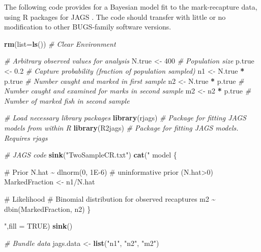 \documentclass[
]{krantz}
\makeatletter
\newenvironment{Shaded}{\begin{snugshade}}{\end{snugshade}}
\newcommand{\AttributeTok}[1]{\textcolor[rgb]{0.27,0.27,0.27}{#1}}
\newcommand{\CommentTok}[1]{\textcolor[rgb]{0.37,0.37,0.37}{\textit{#1}}}
\newcommand{\ConstantTok}[1]{\textcolor[rgb]{0.37,0.37,0.37}{#1}}
\newcommand{\DecValTok}[1]{\textcolor[rgb]{0.06,0.06,0.06}{#1}}
\newcommand{\FloatTok}[1]{\textcolor[rgb]{0.06,0.06,0.06}{#1}}
\newcommand{\FunctionTok}[1]{\textcolor[rgb]{0.27,0.27,0.27}{\textbf{#1}}}
\newcommand{\NormalTok}[1]{#1}
\newcommand{\OtherTok}[1]{\textcolor[rgb]{0.37,0.37,0.37}{#1}}
\newcommand{\SpecialCharTok}[1]{\textcolor[rgb]{0.43,0.43,0.43}{\textbf{#1}}}
\newcommand{\StringTok}[1]{\textcolor[rgb]{0.5,0.5,0.5}{#1}}
\newenvironment{kframe}{%
\medskip{}
\setlength{\fboxsep}{.8em}
 \def\at@end@of@kframe{}%
 \ifinner\ifhmode%
  \def\at@end@of@kframe{\end{minipage}}%
  \begin{minipage}{\columnwidth}%
 \fi\fi%
 \def\FrameCommand##1{\hskip\@totalleftmargin \hskip-\fboxsep
 \colorbox{shadecolor}{##1}\hskip-\fboxsep
     \hskip-\linewidth \hskip-\@totalleftmargin \hskip\columnwidth}%
 \MakeFramed {\advance\hsize-\width
   \@totalleftmargin\z@ \linewidth\hsize
   \@setminipage}}%
 {\par\unskip\endMakeFramed%
 \at@end@of@kframe}
\renewenvironment{Shaded}{\begin{kframe}}{\end{kframe}}
\makeatother
\begin{document}
The following code provides for a Bayesian model fit to the mark-recapture data, using R packages for JAGS \citep{plummer2003}. The code should transfer with little or no modification to other BUGS-family software versions.

\begin{Shaded}
\begin{Highlighting}[]
\FunctionTok{rm}\NormalTok{(}\AttributeTok{list=}\FunctionTok{ls}\NormalTok{()) }\CommentTok{\# Clear Environment}

\CommentTok{\# Arbitrary \textquotesingle{}observed\textquotesingle{} values for analysis}
\NormalTok{N.true }\OtherTok{\textless{}{-}} \DecValTok{400}  \CommentTok{\# Population size}
\NormalTok{p.true }\OtherTok{\textless{}{-}} \FloatTok{0.2} \CommentTok{\# Capture probability (fraction of population sampled)}
\NormalTok{n1 }\OtherTok{\textless{}{-}}\NormalTok{ N.true }\SpecialCharTok{*}\NormalTok{ p.true }\CommentTok{\# Number caught and marked in first sample}
\NormalTok{n2 }\OtherTok{\textless{}{-}}\NormalTok{ N.true }\SpecialCharTok{*}\NormalTok{ p.true }\CommentTok{\# Number caught and examined for marks in second sample}
\NormalTok{m2 }\OtherTok{\textless{}{-}}\NormalTok{ n2 }\SpecialCharTok{*}\NormalTok{ p.true }\CommentTok{\# Number of marked fish in second sample}

\CommentTok{\# Load necessary library packages}
\FunctionTok{library}\NormalTok{(rjags)   }\CommentTok{\# Package for fitting JAGS models from within R}
\FunctionTok{library}\NormalTok{(R2jags)  }\CommentTok{\# Package for fitting JAGS models. Requires rjags}

\CommentTok{\# JAGS code}
\FunctionTok{sink}\NormalTok{(}\StringTok{"TwoSampleCR.txt"}\NormalTok{)}
\FunctionTok{cat}\NormalTok{(}\StringTok{"}
\StringTok{    model \{}

\StringTok{  \# Prior}
\StringTok{    N.hat \textasciitilde{} dlnorm(0, 1E{-}6) \# uninformative prior (N.hat\textgreater{}0)}
\StringTok{    MarkedFraction \textless{}{-} n1/N.hat}

\StringTok{  \# Likelihood}
\StringTok{    \# Binomial distribution for observed recaptures}
\StringTok{    m2 \textasciitilde{} dbin(MarkedFraction, n2)}
\StringTok{    \}}

\StringTok{    "}\NormalTok{,}\AttributeTok{fill =} \ConstantTok{TRUE}\NormalTok{)}
\FunctionTok{sink}\NormalTok{()}

\CommentTok{\# Bundle data}
\NormalTok{jags.data }\OtherTok{\textless{}{-}} \FunctionTok{list}\NormalTok{(}\StringTok{"n1"}\NormalTok{, }\StringTok{"n2"}\NormalTok{, }\StringTok{"m2"}\NormalTok{)}


\end{Highlighting}
\end{Shaded}
\end{document}
